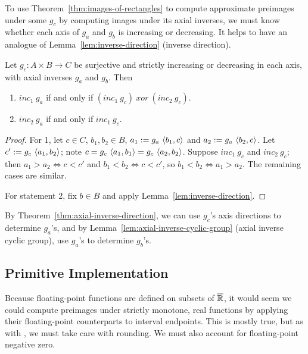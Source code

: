 To use Theorem~\ref{thm:images-of-rectangles} to compute approximate preimages under some $g_c$ by computing images under its axial inverses, we must know whether each axis of $g_a$ and $g_b$ is increasing or decreasing.
It helps to have an analogue of Lemma~\ref{lem:inverse-direction} (inverse direction).

\begin{theorem}
\label{thm:axial-inverse-direction}
Let $g_c : A \times B \to C$ be surjective and strictly increasing or decreasing in each axis, with axial inverses $g_a$ and $g_b$.
Then
\begin{enumerate}
	\item $inc_1~g_a$ if and only if $(inc_1~g_c)~xor~(inc_2~g_c)$.
	\item $inc_2~g_a$ if and only if $inc_1~g_c$.
\end{enumerate}
\end{theorem}
\begin{proof}
For 1, let $c \in C$, $b_1,b_2 \in B$, $a_1 := g_a~\langle{b_1,c}\rangle$ and $a_2 := g_a~\langle{b_2,c}\rangle$.
Let $c' := g_c~\langle{a_1,b_2}\rangle$; note $c = g_c~\langle{a_1,b_1}\rangle = g_c~\langle{a_2,b_2}\rangle$.
Suppose $inc_1~g_c$ and $inc_2~g_c$; then $a_1 > a_2 \iff c < c'$ and $b_1 < b_2 \iff c < c'$, so $b_1 < b_2 \iff a_1 > a_2$.
The remaining cases are similar.

For statement 2, fix $b \in B$ and apply Lemma~\ref{lem:inverse-direction}.
\end{proof}

By Theorem~\ref{thm:axial-inverse-direction}, we can use $g_c$'s axis directions to determine $g_a$'s, and by Lemma~\ref{lem:axial-inverse-cyclic-group} (axial inverse cyclic group), use $g_a$'s to determine $g_b$'s.



\subsection{Primitive Implementation}
\label{sec:primitive-implementation}

Because floating-point functions are defined on subsets of $\cl{\Re}$, it would seem we could compute preimages under strictly monotone, real functions by applying their floating-point counterparts to interval endpoints.
This is mostly true, but as with , we must take care with rounding.
We must also account for floating-point negative zero.

